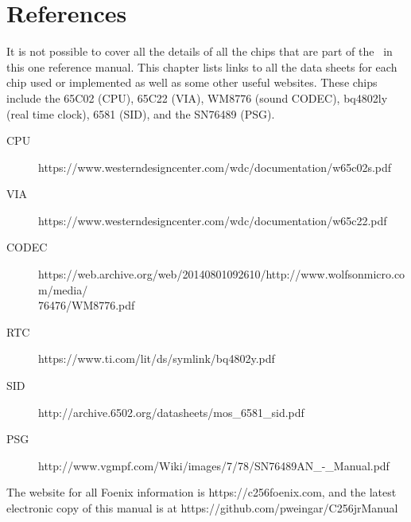 \chapter{References}

It is not possible to cover all the details of all the chips that are part of the \jr\ in this one reference manual. This chapter lists links to all the data sheets for each chip used or implemented as well as some other useful websites. These chips include the 65C02 (CPU), 65C22 (VIA), WM8776 (sound CODEC), bq4802ly (real time clock), 6581 (SID), and the SN76489 (PSG).

\begin{description}
    \item[CPU] https://www.westerndesigncenter.com/wdc/documentation/w65c02s.pdf
    \item[VIA] https://www.westerndesigncenter.com/wdc/documentation/w65c22.pdf
    \item[CODEC] https://web.archive.org/web/20140801092610/http://www.wolfsonmicro.com/media/\\76476/WM8776.pdf
    \item[RTC] https://www.ti.com/lit/ds/symlink/bq4802y.pdf
    \item[SID] http://archive.6502.org/datasheets/mos\_6581\_sid.pdf
    \item[PSG] http://www.vgmpf.com/Wiki/images/7/78/SN76489AN\_-\_Manual.pdf
\end{description}

The website for all Foenix information is https://c256foenix.com, and the latest electronic copy of this manual is at https://github.com/pweingar/C256jrManual
